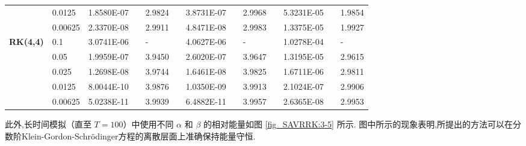 \begin{table}[H]
\begin{tabular}{lllllrlrlrlrlrl}
\multicolumn{2}{l}{} & \multicolumn{2}{l}{0.0125} & 1.8580E-07 &       & 2.9824  &       & 3.8731E-07 &       & 2.9968  &       & 5.3231E-05 &       & 1.9854  \\
\multicolumn{2}{l}{} & \multicolumn{2}{l}{0.00625} & 2.3370E-08 &       & 2.9911  &       & 4.8471E-08 &       & 2.9983  &       & 1.3375E-05 &       & 1.9927  \\
\multicolumn{2}{l}{\multirow{5}[1]{*}{\textbf{RK(4,4)}}} & \multicolumn{2}{l}{0.1} & 3.0741E-06 &       & -     &       & 4.0627E-06 &       & -     &       & 1.0278E-04 &       & - \\
\multicolumn{2}{l}{} & \multicolumn{2}{l}{0.05} & 1.9959E-07 &       & 3.9450  &       & 2.6020E-07 &       & 3.9647  &       & 1.3195E-05 &       & 2.9615  \\
\multicolumn{2}{l}{} & \multicolumn{2}{l}{0.025} & 1.2698E-08 &       & 3.9744  &       & 1.6461E-08 &       & 3.9825  &       & 1.6711E-06 &       & 2.9811  \\
\multicolumn{2}{l}{} & \multicolumn{2}{l}{0.0125} & 8.0044E-10 &       & 3.9876  &       & 1.0350E-09 &       & 3.9913  &       & 2.1024E-07 &       & 2.9906  \\
\multicolumn{2}{l}{} & \multicolumn{2}{l}{0.00625} & 5.0238E-11 &       & 3.9939  &       & 6.4882E-11 &       & 3.9957  &       & 2.6365E-08 &       & 2.9953  \\
\bottomrule
\end{tabular}%
\label{tab_SAVRRK:6-4}%
\end{table}%

此外,长时间模拟（直至 $T=100$）中使用不同 $\alpha$ 和 $\beta$ 的相对能量如图 \ref{fig_SAVRRK:3-5} 所示.
图中所示的现象表明,所提出的方法可以在分数阶Klein-Gordon-Schr{\"o}dinger方程的离散层面上准确保持能量守恒.

